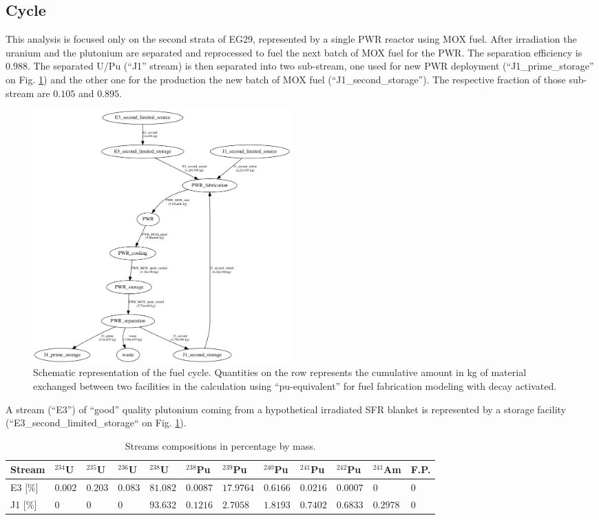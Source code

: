 \documentclass{anstrans}
\begin{document}
\subsection{Cycle}

This analysis is focused only on the second strata of EG29, represented by a
single PWR reactor using MOX fuel. After irradiation the uranium and the
plutonium are separated and reprocessed to fuel the next batch of MOX fuel for
the PWR. The separation efficiency is $0.988$. The separated U/Pu (``J1''
stream) is then separated into two sub-stream, one used for new PWR deployment
(``J1\_prime\_storage'' on Fig. \ref{fig:flow}) and the other one for the
production the new batch of MOX fuel (``J1\_second\_storage''). The respective
fraction of those sub-stream are $0.105$ and $0.895$.

\begin{figure}[ht] %
  \centering
  \includegraphics[width=0.48\textwidth]{flow}
  \caption{Schematic representation of the fuel cycle. Quantities on the row
  represents the cumulative amount in kg of material exchanged between two
  facilities in the calculation using ``pu-equivalent'' for fuel fabrication
  modeling with decay activated.}
  \label{fig:flow}
\end{figure}

A stream (``E3'') of ``good'' quality plutonium coming from a hypothetical irradiated
SFR blanket is represented by a storage facility
(``E3\_second\_limited\_storage`` on Fig. \ref{fig:flow}).

\begin{table}[htb]
  \centering
  \begin{tabular}{llllllllllll}\toprule
    Stream 
    & $^{234}$U   & $^{235}$U   & $^{236}$U   & $^{238}$U   
    & $^{238}$Pu  & $^{239}$Pu  & $^{240}$Pu  & $^{241}$Pu  & $^{242}$Pu 
    & $^{241}$Am  & F.P. \\ \midrule
    E3 [\%]
    & $0.002$   & $0.203$    & $0.083$   & $81.082$
    & $0.0087$  & $17.9764$  & $0.6166$  & $0.0216$  & $0.0007$
    & $0$         & $0$ \\
    J1 [\%]
    & $0$       & $0$        & $0$       & $93.632$
    & $0.1216$  & $2.7058$   & $1.8193$  & $0.7402$  & $0.6833$
    & $0.2978$  & $0$ \\
    \bottomrule
  \end{tabular}
  \caption{Streams compositions in percentage by mass.}
  \label{tab:strem_compo}
\end{table}
\end{document}
